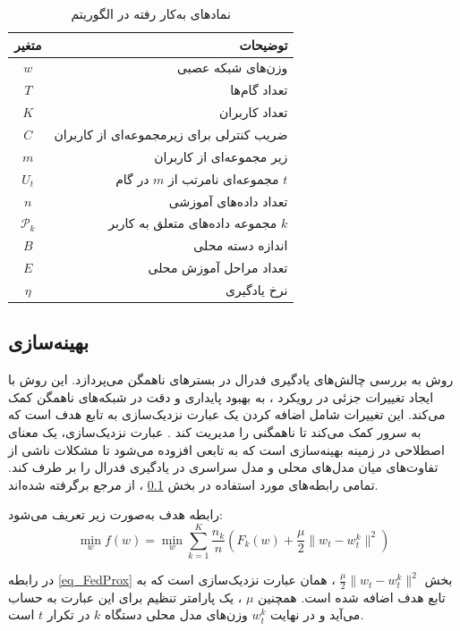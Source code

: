 \begin{table}[h]
	\centering
	\caption{نمادهای به‌کار رفته در الگوریتم
	}
	\label{tabel_FedAvgNotations}
	\begin{tabular}{cr}
		\hline
		متغیر & توضیحات \\
		\hline
		$w$ & وزن‌های شبکه عصبی \\
		$T$ & تعداد گام‌ها \\
		$K$ & تعداد کاربران \\
		$C$ & ضریب کنترلی برای زیرمجموعه‌ای از کاربران \\
		$m$ & زیر مجموعه‌ای از کاربران \\
		$U_t$ & مجموعه‌ای نامرتب از $m$ در گام $t$ \\
		$n$ & تعداد داده‌های آموزشی \\
		$\mathcal{P}_k$ & مجموعه داده‌های متعلق به کاربر $k$ \\
		$B$ & اندازه دسته محلی \\
		$E$ & تعداد مراحل آموزش محلی \\
		$\eta$ & نرخ یادگیری
	\end{tabular}
\end{table}


\subsection{
بهینه‌سازی
}\label{sec_FedProx}
روش
به بررسی چالش‌های یادگیری فدرال در بسترهای ناهمگن می‌پردازد. این روش با ایجاد تغییرات جزئی در رویکرد
%
، به بهبود پایداری و دقت در شبکه‌های ناهمگن کمک می‌کند. این تغییرات شامل اضافه کردن یک عبارت نزدیک‌سازی%
به تابع هدف است که به سرور کمک می‌کند تا ناهمگنی را مدیریت کند
\cite{li2020federatedheteroneneous}.
عبارت نزدیک‌سازی، یک معنای اصطلاحی در زمینه بهینه‌سازی است که به تابعی افزوده می‌شود تا مشکلات ناشی از تفاوت‌های میان مدل‌های محلی و مدل سراسری در یادگیری فدرال را بر طرف کند.
تمامی رابطه‌های مورد استفاده در بخش
\ref{sec_FedProx}%
، از مرجع 
\cite{li2020federatedheteroneneous} 
برگرفته شده‌اند.

رابطه هدف
به‌صورت زیر تعریف می‌شود:
\begin{equation}
\min_{w} f(w) = \min_{w} \sum_{k=1}^{K} \frac{n_k}{n} \left( F_k(w) + \frac{\mu}{2} \|w_t - w_t^k\|^2 \right)
\label{eq_FedProx}
\end{equation}

در رابطه
\eqref{eq_FedProx}
بخش
$\frac{\mu}{2} \|w_t - w_t^k\|^2$%
، همان عبارت نزدیک‌سازی است که به تابع هدف اضافه شده است. همچنین
$\mu$%
، یک پارامتر تنظیم برای این عبارت به حساب می‌آید و در نهایت
$w_t^k$
وزن‌های مدل محلی دستگاه
$k$
در تکرار
$t$
است.

